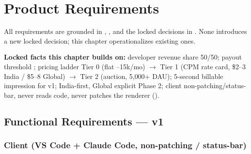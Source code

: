 \chapter{Product Requirements}
\label{chap:product-requirements}

All requirements are grounded in \cite{mvpspec_2026}, \cite{prd_2026}, and the locked decisions in \cite{masterplan_2026}. None introduces a new locked decision; this chapter operationalizes existing ones.

\textbf{Locked facts this chapter builds on:} developer revenue share 50/50; payout threshold ; pricing ladder Tier 0 (flat --15k/mo) $\to$ Tier 1 (CPM rate card, \$2--3 India / \$5--8 Global) $\to$ Tier 2 (auction, 5{,}000+ DAU); 5-second billable impression for v1; India-first, Global explicit Phase 2; client non-patching/status-bar, never reads code, never patches the renderer (\cite{masterplan_2026}).

\section{Functional Requirements --- v1}
\label{sec:functional-requirements}

\subsection{Client (VS Code + Claude Code, non-patching / status-bar)}

